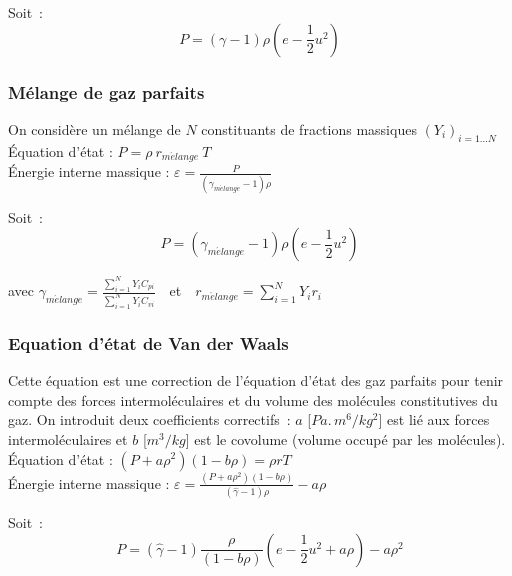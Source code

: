 Soit~:
\begin{equation}\label{Cfbl_Cfbase_eq_pression_gp_cfbase}
P = (\gamma -1) \rho (e - \frac{1}{2} u^2)
\end{equation}


\subsubsection*{M\'elange de gaz parfaits}

On consid\`ere un m\'elange de $N$ constituants de fractions massiques
$(Y_i)_{i=1 \ldots N}$\\

\'Equation d'\'etat : $P = \rho\ r_{m\acute elange}\ T$\\

\'Energie interne massique :
$\varepsilon = \displaystyle\frac{P}{(\gamma_{m\acute elange} -1)\rho}$

Soit~:
\begin{equation}\label{Cfbl_Cfbase_eq_pression_melange_gp_cfbase}
P = (\gamma_{m\acute elange} -1) \rho (e - \frac{1}{2} u^2)
\end{equation}

avec $\gamma_{m\acute elange}
= \displaystyle\frac{\sum\limits_{i=1}^{N} {Y_i C_{pi}}}
{\sum\limits_{i=1}^{N} {Y_i C_{vi}}}$\ \
et\ \ $r_{m\acute elange} = \displaystyle\sum\limits_{i=1}^{N} {Y_i r_i}$


\subsubsection*{Equation d'\'etat de Van der Waals}

Cette \'equation est une correction de l'\'equation d'\'etat
des gaz parfaits pour tenir compte des forces intermol\'eculaires
et du volume des mol\'ecules constitutives du gaz.
On introduit deux coefficients correctifs~:
$a$ [$Pa.\,m^6 / kg^2$] est li\'e aux forces intermol\'eculaires
et $b$ [$m^3/kg$] est le covolume (volume occup\'e par les mol\'ecules).\\

\'Equation d'\'etat : $(P+a\rho^2)(1-b\rho) = \rho r T$\\

\'Energie interne massique :
$\varepsilon = \displaystyle\frac{(P+a\rho^2)(1-b\rho)}
{(\hat{\gamma} -1)\rho} - a \rho$

Soit~:
\begin{equation}\label{Cfbl_Cfbase_eq_pression_vdw_cfbase}
P = (\hat{\gamma} -1) \displaystyle\frac{\rho}{(1-b\rho)}
(e - \frac{1}{2} u^2 + a\rho) - a \rho^2
\end{equation}

